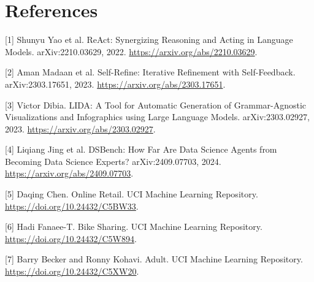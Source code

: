 \section*{References}
{[}1{]} Shunyu Yao et al. ReAct: Synergizing Reasoning and Acting in Language Models. arXiv:2210.03629, 2022. \url{https://arxiv.org/abs/2210.03629}.

{[}2{]} Aman Madaan et al. Self-Refine: Iterative Refinement with Self-Feedback. arXiv:2303.17651, 2023. \url{https://arxiv.org/abs/2303.17651}.

{[}3{]} Victor Dibia. LIDA: A Tool for Automatic Generation of Grammar-Agnostic Visualizations and Infographics using Large Language Models. arXiv:2303.02927, 2023. \url{https://arxiv.org/abs/2303.02927}.

{[}4{]} Liqiang Jing et al. DSBench: How Far Are Data Science Agents from Becoming Data Science Experts? arXiv:2409.07703, 2024. \url{https://arxiv.org/abs/2409.07703}.

{[}5{]} Daqing Chen. Online Retail. UCI Machine Learning Repository. \url{https://doi.org/10.24432/C5BW33}.

{[}6{]} Hadi Fanaee-T. Bike Sharing. UCI Machine Learning Repository. \url{https://doi.org/10.24432/C5W894}.

{[}7{]} Barry Becker and Ronny Kohavi. Adult. UCI Machine Learning Repository. \url{https://doi.org/10.24432/C5XW20}.

